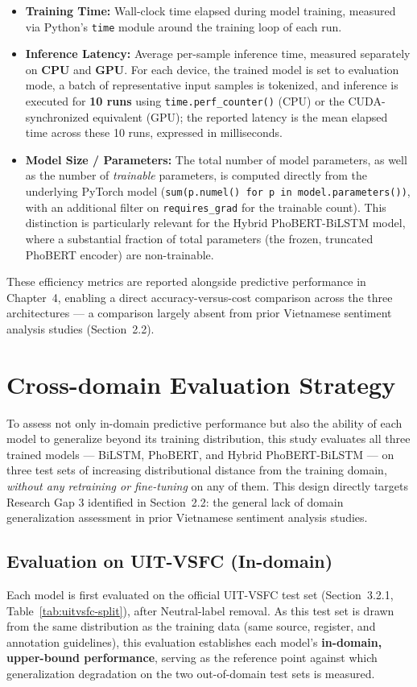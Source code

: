 \documentclass[12pt]{report} %
\begin{document}
\begin{itemize}
    \item \textbf{Training Time:} Wall-clock time elapsed during model training, measured via Python's \texttt{time} module around the training loop of each run.
    \item \textbf{Inference Latency:} Average per-sample inference time, measured separately on \textbf{CPU} and \textbf{GPU}. For each device, the trained model is set to evaluation mode, a batch of representative input samples is tokenized, and inference is executed for \textbf{10 runs} using \texttt{time.perf\_counter()} (CPU) or the CUDA-synchronized equivalent (GPU); the reported latency is the mean elapsed time across these 10 runs, expressed in milliseconds.
    \item \textbf{Model Size / Parameters:} The total number of model parameters, as well as the number of \textit{trainable} parameters, is computed directly from the underlying PyTorch model (\texttt{sum(p.numel() for p in model.parameters())}, with an additional filter on \texttt{requires\_grad} for the trainable count). This distinction is particularly relevant for the Hybrid PhoBERT-BiLSTM model, where a substantial fraction of total parameters (the frozen, truncated PhoBERT encoder) are non-trainable.
\end{itemize}

These efficiency metrics are reported alongside predictive performance in Chapter~4, enabling a direct accuracy-versus-cost comparison across the three architectures --- a comparison largely absent from prior Vietnamese sentiment analysis studies (Section~2.2).

\section{Cross-domain Evaluation Strategy}

To assess not only in-domain predictive performance but also the ability of each model to generalize beyond its training distribution, this study evaluates all three trained models --- BiLSTM, PhoBERT, and Hybrid PhoBERT-BiLSTM --- on three test sets of increasing distributional distance from the training domain, \textit{without any retraining or fine-tuning} on any of them. This design directly targets Research Gap 3 identified in Section~2.2: the general lack of domain generalization assessment in prior Vietnamese sentiment analysis studies.

\subsection{Evaluation on UIT-VSFC (In-domain)}
Each model is first evaluated on the official UIT-VSFC test set (Section~3.2.1, Table~\ref{tab:uitvsfc-split}), after Neutral-label removal. As this test set is drawn from the same distribution as the training data (same source, register, and annotation guidelines), this evaluation establishes each model's \textbf{in-domain, upper-bound performance}, serving as the reference point against which generalization degradation on the two out-of-domain test sets is measured.
\end{document}
